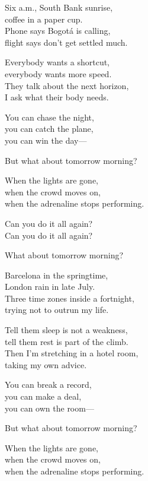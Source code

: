 \begin{lyrics}

Six a.m., South Bank sunrise,\\
coffee in a paper cup.\\
Phone says Bogotá is calling,\\
flight says don't get settled much.

Everybody wants a shortcut,\\
everybody wants more speed.\\
They talk about the next horizon,\\
I ask what their body needs.


You can chase the night,\\
you can catch the plane,\\
you can win the day—


But what about tomorrow morning?

When the lights are gone,\\
when the crowd moves on,\\
when the adrenaline stops performing.

Can you do it all again?\\
Can you do it all again?

What about tomorrow morning?


Barcelona in the springtime,\\
London rain in late July.\\
Three time zones inside a fortnight,\\
trying not to outrun my life.

Tell them sleep is not a weakness,\\
tell them rest is part of the climb.\\
Then I'm stretching in a hotel room,\\
taking my own advice.


You can break a record,\\
you can make a deal,\\
you can own the room—


But what about tomorrow morning?

When the lights are gone,\\
when the crowd moves on,\\
when the adrenaline stops performing.


\end{lyrics}
